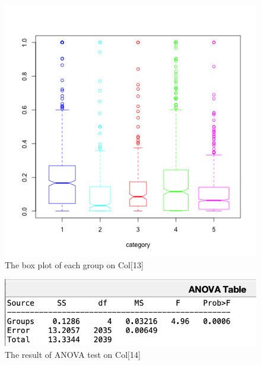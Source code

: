 \documentclass[a4paper]{article}
\begin{document}
\begin{figure}[!h]
	\centering
	\includegraphics[width=\linewidth]{images/5b2.png}
	\caption{\label{5b2}The box plot of each group on Col[13]}
\end{figure}
\begin{figure}[!h]
	\centering
	\includegraphics[width=\linewidth]{images/5b03.png}
	\caption{\label{5b03}The result of ANOVA test on Col[14]}
\end{figure}
\end{document}
